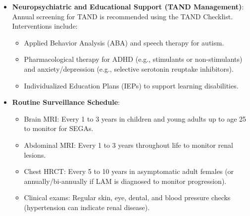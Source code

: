 \begin{itemize}
\begin{itemize}
        \item \textit{Renal Angiomyolipoma Embolization}: For renal angiomyolipomas that are bleeding or have a high risk of rupture (size greater than 4 cm or containing aneurysms greater than 5 mm), transcatheter selective arterial embolization is performed. This procedure cuts off the blood supply to the tumor, promoting shrinkage and preserving normal kidney tissue.
        \item \textit{Nephron-Sparing Surgery}: Partial nephrectomy is preferred over total nephrectomy if surgery is required, to protect long-term kidney function and prevent chronic renal failure.
    \end{itemize}
    \item \textbf{Neuropsychiatric and Educational Support (TAND Management)}: Annual screening for TAND is recommended using the TAND Checklist. Interventions include:
    \begin{itemize}
        \item Applied Behavior Analysis (ABA) and speech therapy for autism.
        \item Pharmacological therapy for ADHD (e.g., stimulants or non-stimulants) and anxiety/depression (e.g., selective serotonin reuptake inhibitors).
        \item Individualized Education Plans (IEPs) to support learning disabilities.
    \end{itemize}
    \item \textbf{Routine Surveillance Schedule}:
    \begin{itemize}
        \item Brain MRI: Every 1 to 3 years in children and young adults up to age 25 to monitor for SEGAs.
        \item Abdominal MRI: Every 1 to 3 years throughout life to monitor renal lesions.
        \item Chest HRCT: Every 5 to 10 years in asymptomatic adult females (or annually/bi-annually if LAM is diagnosed to monitor progression).
        \item Clinical exams: Regular skin, eye, dental, and blood pressure checks (hypertension can indicate renal disease).
    \end{itemize}
\end{itemize}

